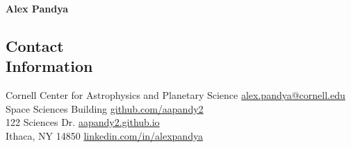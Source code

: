 \documentclass[margin,line,11pt]{resume}
\begin{document}
{\Huge \textbf{Alex Pandya}}
\begin{resume}


\section{\mysidestyle Contact\\Information}

\faHome \space Cornell Center for Astrophysics and Planetary Science \hfill \faEnvelope\hspace{0.7mm} \href{mailto:alex.pandya@cornell.edu}{alex.pandya@cornell.edu} \hspace{3.8mm} \hphantom{.}\\
\hphantom{.}\hspace{3.5mm} Space Sciences Building \hfill \faGithub \hspace{1.2mm} \href{https://github.com/aapandy2}{github.com/aapandy2} \hspace{9mm}\hphantom{.}\\
\hphantom{.}\hspace{3.5mm} 122 Sciences Dr. \hfill \faTv \hspace{0.5mm} \href{https://aapandy2.github.io/}{aapandy2.github.io}\hspace{15mm}\hphantom{.}\\
\hphantom{.}\hspace{3.7mm} Ithaca, NY 14850 \hfill \faLinkedin \hspace{1mm} \href{https://linkedin.com/in/alexpandya}{linkedin.com/in/alexpandya}\hspace{0mm}\hphantom{.} \\



\end{resume}
\end{document}
